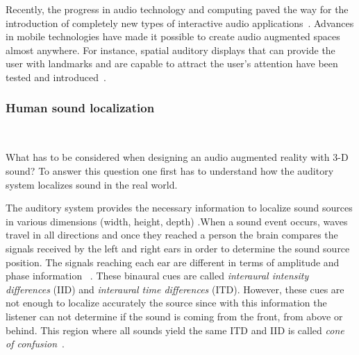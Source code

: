 \documentclass[journal]{IEEEtran}
\begin{document}
Recently, the progress in audio technology and computing paved the way for the introduction of completely new types of interactive audio applications~\cite{harma2004}. Advances in mobile technologies have made it possible to create audio augmented spaces almost anywhere. For instance, spatial auditory displays that can provide the user with landmarks and are capable to attract the user's attention have been tested and introduced~\cite{alvarez2011}. %

\subsubsection*{Human sound localization}~

What has to be considered when designing an audio augmented reality with 3-D sound? To answer this question one first has to understand how the auditory system localizes sound in the real world. 

The auditory system provides the necessary information to localize sound sources in various dimensions (width, height, depth) \cite{Rumsey2001}.When a sound event occurs, waves travel in all directions and once they reached a person the brain compares the signals received by the left and right ears in order to determine the sound source position. The signals reaching each ear are different in terms of amplitude and phase information ~\cite{Rumsey2001}. These binaural cues are called \emph{interaural intensity differences} (IID) and \emph{interaural time differences} (ITD). However, these cues are not enough to localize accurately the source since with this information the listener can not determine if the sound is coming from the front, from above or behind. This region where all sounds yield the same ITD and IID is called \textit{cone of confusion}~\cite{SpatialAudio2007}.
\end{document}
